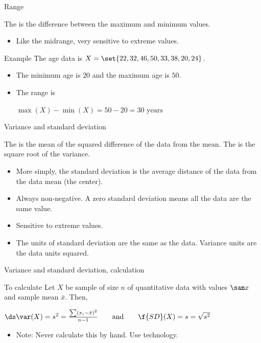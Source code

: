 \documentclass[xcolor=table]{beamer}
\begin{document}
\begin{frame}{Range}
\begin{block}{}
\large
The  is the difference between the maximum and minimum values.
\begin{itemize}
\item Like the midrange, very sensitive to extreme values.
\end{itemize}
\end{block}

\pause
\begin{exampleblock}{Example}
The age data is $X = \set{22, 32, 46, 50, 33, 38, 20, 24}$.
\begin{itemize}
\item The minimum age is $20$ and the maximum age is $50$.
\pause
\item The range is \\
\smallskip
{\centering
$\max(X) - \min(X) = 50 - 20 = 30 \text{ years}$
\par}
\end{itemize}
\smallskip
\end{exampleblock}

\end{frame}

\begin{frame}{Variance and standard deviation}
\begin{block}{}
\large
The  is the mean of the squared difference of the data from the mean. The  is the square root of the variance.
\begin{itemize}
\pause\item More simply, the standard deviation is the average distance of the data from the data mean (the center).
\pause\item Always non-negative. A zero standard deviation means all the data are the same value.
\pause\item Sensitive to extreme values.
\pause\item The units of standard deviation are the same as the data. Variance units are the data units squared.
\end{itemize}
\end{block}
\end{frame}

\begin{frame}{Variance and standard deviation, calculation}
\begin{block}{To calculate}
Let $X$ be sample of size $n$ of quantitative data with values $\sam x$ and sample mean $\bar x$. Then,\\
\smallskip
{\centering
$\ds \var(X) = s^2 = \frac{\sum (x_i - \bar x)^2}{n-1} \qquad \text{and} \qquad  \f{SD}(X) = s = \sqrt{s^2}$
\par}
\begin{itemize}
\pause\item Note: Never calculate this by hand. Use technology.
\end{itemize}
\end{block}
\end{frame}
\end{document}
